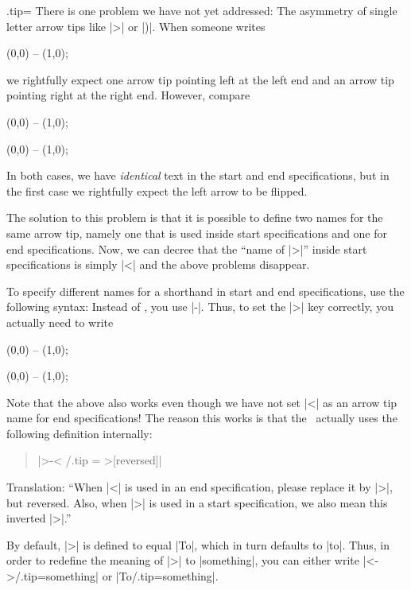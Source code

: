 \begin{handler}{{.tip}{=}}
  There is one problem we have not yet addressed: The asymmetry of
  single letter arrow tips like |>| or |)|. When someone writes 
\begin{codeexample}[]
\tikz \draw [<->] (0,0) -- (1,0);  
\end{codeexample}
  we rightfully expect one arrow tip pointing left at the left end and
  an arrow tip pointing right at the right end. However, compare 
\begin{codeexample}[]
\tikz \draw [>->] (0,0) -- (1,0);  
\end{codeexample}
\begin{codeexample}[]
\tikz {} (0,0) -- (1,0);  
\end{codeexample}
  In both cases, we have \emph{identical} text in the start and end
  specifications, but in the first case we rightfully expect the left
  arrow to be flipped.

  The solution to this problem is that it is possible to define
  two names for the same arrow tip, namely one that is used inside
  start specifications and one for end specifications. Now, we can
  decree that the ``name of |>|'' inside start specifications is
  simply |<| and the above problems disappear.
  
  To specify different names for a shorthand in start and end
  specifications, use the following syntax: Instead of , you
  use |-|. Thus, to set the |>| key correctly, you actually
  need to write
\begin{codeexample}[]
\tikz [<-> /.tip = Stealth] \draw [<->>] (0,0) -- (1,0);  
\end{codeexample}
\begin{codeexample}[]
\tikz [<-> /.tip = Latex] \draw [>-<] (0,0) -- (1,0);  
\end{codeexample}

  Note that the above also works even though we have not set |<| as an
  arrow tip name for end specifications! The reason this works is that
  the \tikzname\ actually uses the following definition internally:
  \begin{quote}
    |>-< /.tip = >[reversed]|
  \end{quote}
  Translation: ``When |<| is used in an end specification, please
  replace it by |>|, but reversed. Also, when |>| is used in a start
  specification, we also mean this inverted |>|.''

  By default, |>| is defined to equal |To|, which in turn defaults to
  |to|. Thus, in order to redefine the meaning of |>| to |something|,
  you can either write |<->/.tip=something| or |To/.tip=something|. 
\end{handler}

